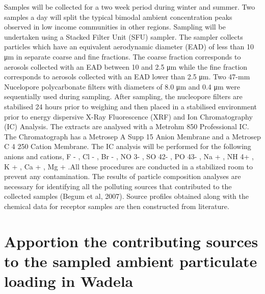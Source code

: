 \documentclass{nwureport}
\begin{document}
Samples will be collected for a two week period during winter and summer. Two samples a day will split the
typical bimodal ambient concentration peaks observed in low income communities in other regions. Sampling
will be undertaken using a Stacked Filter Unit (SFU) sampler. The sampler collects particles which have an
equivalent aerodynamic diameter (EAD) of less than 10 μm in separate coarse and fine fractions. The
coarse fraction corresponds to aerosols collected with an EAD between 10 and 2.5 μm while the fine fraction
corresponds to aerosols collected with an EAD lower than 2.5 μm. Two 47-mm Nucelopore polycarbonate
filters with diameters of 8.0 μm and 0.4 μm were sequentially used during sampling.
After sampling, the nucleopore filters are stabilised 24 hours prior to weighing and then placed in a stabilised
environment prior to energy dispersive X-Ray Fluorescence (XRF) and Ion Chromatography (IC) Analysis.
The extracts are analysed with a Metrohm 850 Professional IC. The Chromatograph has a Metrosep A Supp
15 Anion Membrane and a Metrosep C 4 250 Cation Membrane. The IC analysis will be performed for the
following anions and cations, F - , Cl - , Br - , NO 3- , SO 42- , PO 43- , Na + , NH 4+ , K + , Ca + , Mg + .All these procedures are conducted in a stabilized room to prevent any contamination. The results of particle
composition analyses are necessary for identifying all the polluting sources that contributed to the collected
samples (Begum et al, 2007). Source profiles obtained along with the chemical data for receptor samples
are then constructed from literature.

\section{Apportion the contributing sources to the sampled ambient particulate loading in Wadela}
\end{document}
